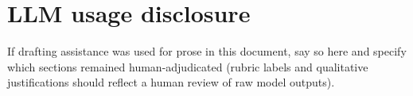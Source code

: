 \section{LLM usage disclosure}
\label{app:llm}

If drafting assistance was used for prose in this document, say so here and specify which sections remained human-adjudicated (rubric labels and qualitative justifications should reflect a human review of raw model outputs).
